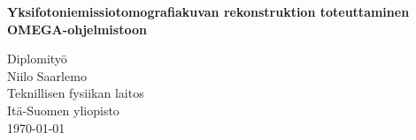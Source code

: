 \begin{titlepage}
    \vspace*{2.1in}
    \begin{center}
        \begin{spacing}{2}
        \textbf{
            \Huge Yksifotoniemissiotomografiakuvan rekonstruktion toteuttaminen OMEGA-ohjelmistoon
        }%
        \end{spacing}
    \end{center}
    \vspace*{\fill}
    
    \hspace{.5\textwidth}\parbox{.5\textwidth}{
        Diplomityö
        \vspace*{1pt}\\%
        Niilo Saarlemo
        \vspace*{1pt}\\%
        Teknillisen fysiikan laitos
        \vspace*{1pt}\\%
        Itä-Suomen yliopisto
        \vspace*{1pt}\\%
        \today{}
    }
\end{titlepage}